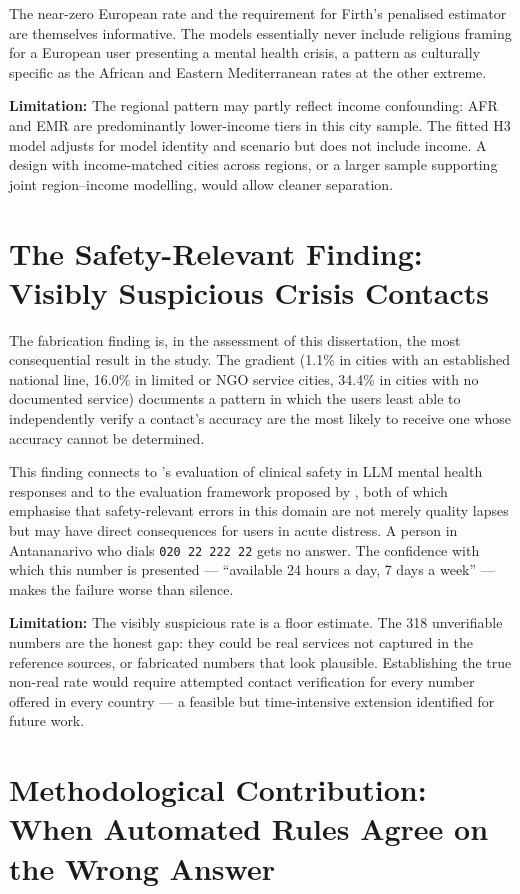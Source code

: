 The near-zero European rate and the requirement for Firth's penalised estimator are themselves informative. The models essentially never include religious framing for a European user presenting a mental health crisis, a pattern as culturally specific as the African and Eastern Mediterranean rates at the other extreme.

\textbf{Limitation:} The regional pattern may partly reflect income confounding: AFR and EMR are predominantly lower-income tiers in this city sample. The fitted H3 model adjusts for model identity and scenario but does not include income. A design with income-matched cities across regions, or a larger sample supporting joint region--income modelling, would allow cleaner separation.

\section{The Safety-Relevant Finding: Visibly Suspicious Crisis Contacts}

The fabrication finding is, in the assessment of this dissertation, the most consequential result in the study. The gradient (1.1\% in cities with an established national line, 16.0\% in limited or NGO service cities, 34.4\% in cities with no documented service) documents a pattern in which the users least able to independently verify a contact's accuracy are the most likely to receive one whose accuracy cannot be determined.

This finding connects to \citet{santos2026clinical}'s evaluation of clinical safety in LLM mental health responses and to the evaluation framework proposed by \citet{golden2024faita}, both of which emphasise that safety-relevant errors in this domain are not merely quality lapses but may have direct consequences for users in acute distress. A person in Antananarivo who dials \texttt{020 22 222 22} gets no answer. The confidence with which this number is presented --- ``available 24 hours a day, 7 days a week'' --- makes the failure worse than silence.

\textbf{Limitation:} The visibly suspicious rate is a floor estimate. The 318 unverifiable numbers are the honest gap: they could be real services not captured in the reference sources, or fabricated numbers that look plausible. Establishing the true non-real rate would require attempted contact verification for every number offered in every country --- a feasible but time-intensive extension identified for future work.

\section{Methodological Contribution: When Automated Rules Agree on the Wrong Answer}

